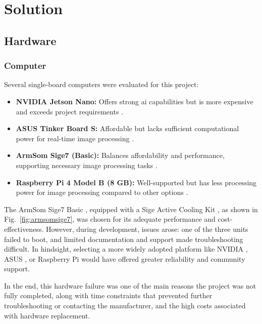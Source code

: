 \chapter{Solution}

\section{Hardware}

\subsection{Computer}\label{subsec:solution_computer}

Several single-board computers were evaluated for this project:

\begin{itemize}
	\item \textbf{NVIDIA Jetson Nano:} Offers strong \acrshort{ai} capabilities but is more expensive and exceeds project requirements \cite{nvidia_jetson_nano}.
	\item \textbf{ASUS Tinker Board S:} Affordable but lacks sufficient computational power for real-time image processing \cite{asus_tinkerboard_s}.
	\item \textbf{ArmSom Sige7 (Basic):} Balances affordability and performance, supporting necessary image processing tasks \cite{armsom_sige7}.
	\item \textbf{Raspberry Pi 4 Model B (8 GB):} Well-supported but has less processing power for image processing compared to other options \cite{raspberry_pi_4b}.
\end{itemize}

The ArmSom Sige7 Basic \cite{armsom_sige7}, equipped with a Sige Active Cooling Kit \cite{armsom_sige_cooling_kit}, as shown in Fig.~\ref{fig:armsomsige7}, was chosen for its adequate performance and cost-effectiveness. However, during development, issues arose: one of the three units failed to boot, and limited documentation and support made troubleshooting difficult. In hindsight, selecting a more widely adopted platform like NVIDIA \cite{nvidia_jetson_nano}, ASUS \cite{asus_tinkerboard_s}, or Raspberry Pi \cite{raspberry_pi_4b} would have offered greater reliability and community support.

In the end, this hardware failure was one of the main reasons the project was not fully completed, along with time constraints that prevented further troubleshooting or contacting the manufacturer, and the high costs associated with hardware replacement.

